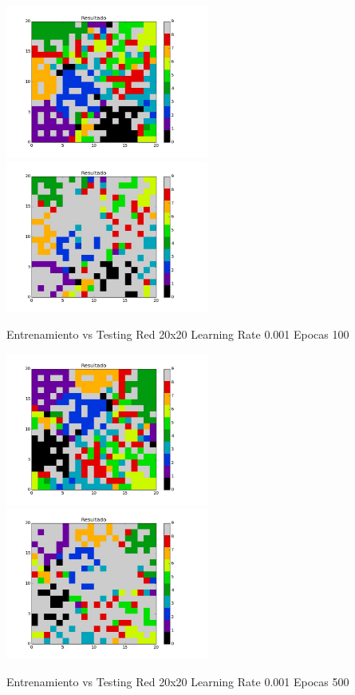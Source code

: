 \includegraphics[width=0.5\textwidth]{img/ej2_train_M_20_lrate_001_epocas_500}
\includegraphics[width=0.5\textwidth]{img/ej2_test_M_20_lrate_001_epocas_500}
{\center \footnotesize Entrenamiento vs Testing Red 20x20 Learning Rate 0.001 Epocas 100\par}
\includegraphics[width=0.5\textwidth]{img/ej2_train_M_20_lrate_001_epocas_1000}
\includegraphics[width=0.5\textwidth]{img/ej2_test_M_20_lrate_001_epocas_1000}
{\center \footnotesize Entrenamiento vs Testing Red 20x20 Learning Rate 0.001 Epocas 500\par}
